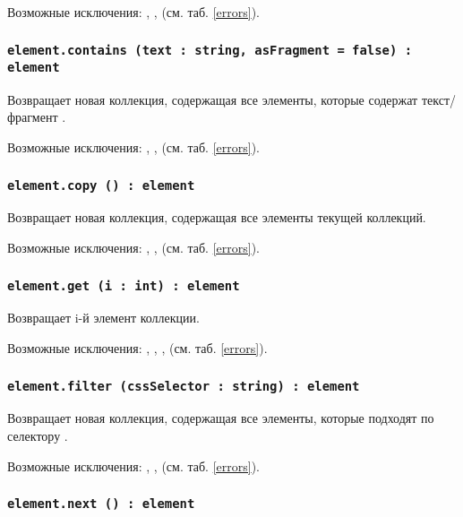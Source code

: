 Возможные исключения: , ,  (см. таб. \ref{errors}).

\subsubsection{\lstinline|element.contains (text : string, asFragment = false) : element|}

Возвращает новая коллекция, содержащая все элементы, которые содержат текст/фрагмент .

Возможные исключения: , ,  (см. таб. \ref{errors}).

\subsubsection{\lstinline|element.copy () : element|}

Возвращает новая коллекция, содержащая все элементы текущей коллекций.

Возможные исключения: , ,  (см. таб. \ref{errors}).

\subsubsection{\lstinline|element.get (i : int) : element|}

Возвращает i-й элемент коллекции.

Возможные исключения: , , ,  (см. таб. \ref{errors}).

\subsubsection{\lstinline|element.filter (cssSelector : string) : element|}

Возвращает новая коллекция, содержащая все элементы, которые подходят по селектору .

Возможные исключения: , ,  (см. таб. \ref{errors}).

\subsubsection{\lstinline|element.next () : element|}

